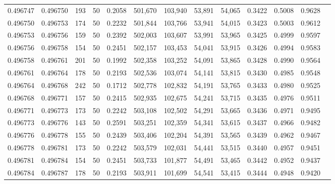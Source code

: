 \begin{tabular}{rrrrrrrrrrrrr}
0.496747 & 0.496750 &   193 &  50 &                                     0.2058 & 501,670 & 103,940 &  53,891 &  54,065 & 0.3422 & 0.5008 & 0.9628 \\
0.496750 & 0.496753 &   174 &  50 &                                     0.2232 & 501,844 & 103,766 &  53,941 &  54,015 & 0.3423 & 0.5003 & 0.9612 \\
0.496753 & 0.496756 &   159 &  50 &                                     0.2392 & 502,003 & 103,607 &  53,991 &  53,965 & 0.3425 & 0.4999 & 0.9597 \\
0.496756 & 0.496758 &   154 &  50 &                                     0.2451 & 502,157 & 103,453 &  54,041 &  53,915 & 0.3426 & 0.4994 & 0.9583 \\
0.496758 & 0.496761 &   201 &  50 &                                     0.1992 & 502,358 & 103,252 &  54,091 &  53,865 & 0.3428 & 0.4990 & 0.9564 \\
0.496761 & 0.496764 &   178 &  50 &                                     0.2193 & 502,536 & 103,074 &  54,141 &  53,815 & 0.3430 & 0.4985 & 0.9548 \\
0.496764 & 0.496768 &   242 &  50 &                                     0.1712 & 502,778 & 102,832 &  54,191 &  53,765 & 0.3433 & 0.4980 & 0.9525 \\
0.496768 & 0.496771 &   157 &  50 &                                     0.2415 & 502,935 & 102,675 &  54,241 &  53,715 & 0.3435 & 0.4976 & 0.9511 \\
0.496771 & 0.496773 &   173 &  50 &                                     0.2242 & 503,108 & 102,502 &  54,291 &  53,665 & 0.3436 & 0.4971 & 0.9495 \\
0.496773 & 0.496776 &   143 &  50 &                                     0.2591 & 503,251 & 102,359 &  54,341 &  53,615 & 0.3437 & 0.4966 & 0.9482 \\
0.496776 & 0.496778 &   155 &  50 &                                     0.2439 & 503,406 & 102,204 &  54,391 &  53,565 & 0.3439 & 0.4962 & 0.9467 \\
0.496778 & 0.496781 &   173 &  50 &                                     0.2242 & 503,579 & 102,031 &  54,441 &  53,515 & 0.3440 & 0.4957 & 0.9451 \\
0.496781 & 0.496784 &   154 &  50 &                                     0.2451 & 503,733 & 101,877 &  54,491 &  53,465 & 0.3442 & 0.4952 & 0.9437 \\
0.496784 & 0.496787 &   178 &  50 &                                     0.2193 & 503,911 & 101,699 &  54,541 &  53,415 & 0.3444 & 0.4948 & 0.9420 \\

\end{tabular}
